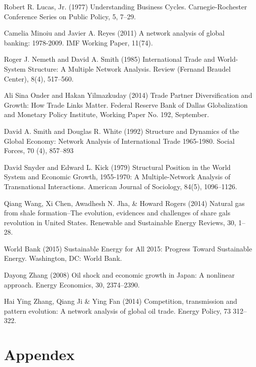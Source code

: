 \documentclass[10pt,letterpaper]{article}
\begin{document}
\begin{thebibliography}{99}
Robert R. Lucas, Jr. (1977) Understanding Business Cycles. Carnegie-Rochester Conference Series on Public Policy, 5, 7--29. 

Camelia Minoiu and Javier A. Reyes (2011) A network analysis of global banking: 1978-2009. IMF Working Paper, 11(74).

Roger J. Nemeth and David A. Smith (1985) International Trade and World-System Structure: A Multiple Network Analysis. Review (Fernand Braudel Center), 8(4), 517--560.

Ali Sina Onder and Hakan Yilmazkuday (2014) Trade Partner Diversification and Growth: How Trade Links Matter. Federal Reserve Bank of Dallas Globalization and Monetary Policy Institute, Working Paper No. 192, September. 

David A. Smith and Douglas R. White (1992) Structure and Dynamics of the Global Economy: Network Analysis of International Trade 1965-1980. Social Forces, 70 (4), 857--893

David Snyder and Edward L. Kick (1979) Structural Position in the World System and Economic Growth, 1955-1970: A Multiple-Network Analysis of Transnational Interactions. American Journal of Sociology, 84(5), 1096--1126.

Qiang Wang, Xi Chen, Awadhesh N. Jha, \& Howard Rogers (2014) Natural gas from shale formation--The evolution, evidences and challenges of share gals revolution in United States. Renewable and Sustainable Energy Reviews, 30, 1--28.

World Bank (2015) Sustainable Energy for All 2015: Progress Toward Sustainable Energy. Washington, DC: World Bank.

Dayong Zhang (2008) Oil shock and economic growth in Japan: A nonlinear approach. Energy Economics, 30, 2374--2390.

Hai Ying Zhang, Qiang Ji \& Ying Fan (2014) Competition, transmission and pattern evolution: A network analysis of global oil trade. Energy Policy, 73 312--322.

\end{thebibliography} 


\newpage 
\setcounter{secnumdepth}{0}
\section{Appendex} \label{appendix}
\end{document}
